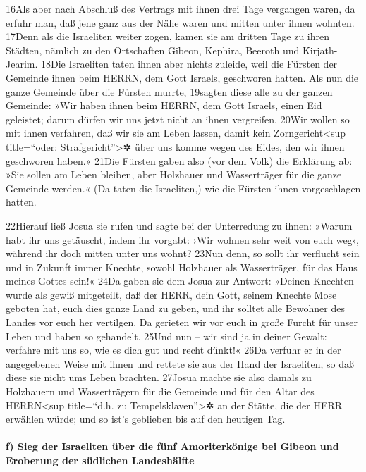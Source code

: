16Als aber nach Abschluß des Vertrags mit ihnen drei Tage vergangen
waren, da erfuhr man, daß jene ganz aus der Nähe waren und mitten unter
ihnen wohnten. 17Denn als die Israeliten weiter zogen, kamen sie am
dritten Tage zu ihren Städten, nämlich zu den Ortschaften Gibeon,
Kephira, Beeroth und Kirjath-Jearim. 18Die Israeliten taten ihnen aber
nichts zuleide, weil die Fürsten der Gemeinde ihnen beim HERRN, dem Gott
Israels, geschworen hatten. Als nun die ganze Gemeinde über die Fürsten
murrte, 19sagten diese alle zu der ganzen Gemeinde: »Wir haben ihnen
beim HERRN, dem Gott Israels, einen Eid geleistet; darum dürfen wir uns
jetzt nicht an ihnen vergreifen. 20Wir wollen so mit ihnen verfahren,
daß wir sie am Leben lassen, damit kein Zorngericht\textless sup
title=``oder: Strafgericht''\textgreater✲ über uns komme wegen des
Eides, den wir ihnen geschworen haben.« 21Die Fürsten gaben also (vor
dem Volk) die Erklärung ab: »Sie sollen am Leben bleiben, aber Holzhauer
und Wasserträger für die ganze Gemeinde werden.« (Da taten die
Israeliten,) wie die Fürsten ihnen vorgeschlagen hatten.

22Hierauf ließ Josua sie rufen und sagte bei der Unterredung zu ihnen:
»Warum habt ihr uns getäuscht, indem ihr vorgabt: ›Wir wohnen sehr weit
von euch weg‹, während ihr doch mitten unter uns wohnt? 23Nun denn, so
sollt ihr verflucht sein und in Zukunft immer Knechte, sowohl Holzhauer
als Wasserträger, für das Haus meines Gottes sein!« 24Da gaben sie dem
Josua zur Antwort: »Deinen Knechten wurde als gewiß mitgeteilt, daß der
HERR, dein Gott, seinem Knechte Mose geboten hat, euch dies ganze Land
zu geben, und ihr solltet alle Bewohner des Landes vor euch her
vertilgen. Da gerieten wir vor euch in große Furcht für unser Leben und
haben so gehandelt. 25Und nun -- wir sind ja in deiner Gewalt: verfahre
mit uns so, wie es dich gut und recht dünkt!« 26Da verfuhr er in der
angegebenen Weise mit ihnen und rettete sie aus der Hand der Israeliten,
so daß diese sie nicht ums Leben brachten. 27Josua machte sie also
damals zu Holzhauern und Wasserträgern für die Gemeinde und für den
Altar des HERRN\textless sup title=``d.h. zu
Tempelsklaven''\textgreater✲ an der Stätte, die der HERR erwählen würde;
und so ist's geblieben bis auf den heutigen Tag.

\hypertarget{f-sieg-der-israeliten-uxfcber-die-fuxfcnf-amoriterkuxf6nige-bei-gibeon-und-eroberung-der-suxfcdlichen-landeshuxe4lfte}{%
\paragraph{f) Sieg der Israeliten über die fünf Amoriterkönige bei
Gibeon und Eroberung der südlichen
Landeshälfte}\label{f-sieg-der-israeliten-uxfcber-die-fuxfcnf-amoriterkuxf6nige-bei-gibeon-und-eroberung-der-suxfcdlichen-landeshuxe4lfte}}

